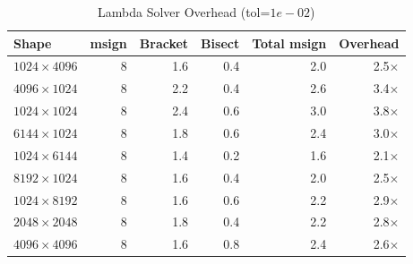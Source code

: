 \begin{table}[t]
\centering
\caption{Lambda Solver Overhead (tol=$1e-02$)}
\label{tab:lambda_solver_overhead}
\begin{tabular}{lrrrrr}
\toprule
Shape & msign & Bracket & Bisect & Total msign & Overhead \\
\midrule
$1024\times4096$ & 8 & 1.6 & 0.4 & 2.0 & 2.5$\times$ \\
$4096\times1024$ & 8 & 2.2 & 0.4 & 2.6 & 3.4$\times$ \\
$1024\times1024$ & 8 & 2.4 & 0.6 & 3.0 & 3.8$\times$ \\
$6144\times1024$ & 8 & 1.8 & 0.6 & 2.4 & 3.0$\times$ \\
$1024\times6144$ & 8 & 1.4 & 0.2 & 1.6 & 2.1$\times$ \\
$8192\times1024$ & 8 & 1.6 & 0.4 & 2.0 & 2.5$\times$ \\
$1024\times8192$ & 8 & 1.6 & 0.6 & 2.2 & 2.9$\times$ \\
$2048\times2048$ & 8 & 1.8 & 0.4 & 2.2 & 2.8$\times$ \\
$4096\times4096$ & 8 & 1.6 & 0.8 & 2.4 & 2.6$\times$ \\
\bottomrule
\end{tabular}
\end{table}